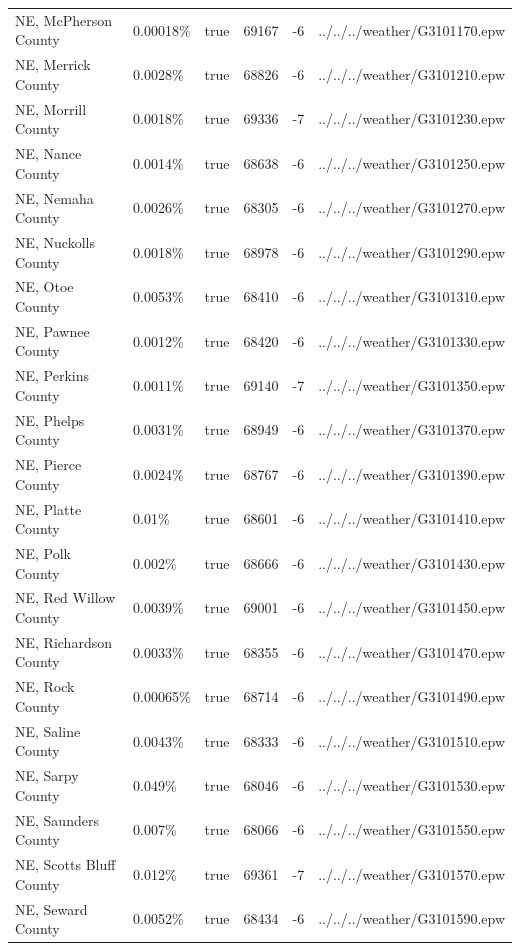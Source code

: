 \begin{longtable}[]{@{}llllll@{}}
NE, McPherson County & 0.00018\% & true & 69167 & -6 &
../../../weather/G3101170.epw \\
NE, Merrick County & 0.0028\% & true & 68826 & -6 &
../../../weather/G3101210.epw \\
NE, Morrill County & 0.0018\% & true & 69336 & -7 &
../../../weather/G3101230.epw \\
NE, Nance County & 0.0014\% & true & 68638 & -6 &
../../../weather/G3101250.epw \\
NE, Nemaha County & 0.0026\% & true & 68305 & -6 &
../../../weather/G3101270.epw \\
NE, Nuckolls County & 0.0018\% & true & 68978 & -6 &
../../../weather/G3101290.epw \\
NE, Otoe County & 0.0053\% & true & 68410 & -6 &
../../../weather/G3101310.epw \\
NE, Pawnee County & 0.0012\% & true & 68420 & -6 &
../../../weather/G3101330.epw \\
NE, Perkins County & 0.0011\% & true & 69140 & -7 &
../../../weather/G3101350.epw \\
NE, Phelps County & 0.0031\% & true & 68949 & -6 &
../../../weather/G3101370.epw \\
NE, Pierce County & 0.0024\% & true & 68767 & -6 &
../../../weather/G3101390.epw \\
NE, Platte County & 0.01\% & true & 68601 & -6 &
../../../weather/G3101410.epw \\
NE, Polk County & 0.002\% & true & 68666 & -6 &
../../../weather/G3101430.epw \\
NE, Red Willow County & 0.0039\% & true & 69001 & -6 &
../../../weather/G3101450.epw \\
NE, Richardson County & 0.0033\% & true & 68355 & -6 &
../../../weather/G3101470.epw \\
NE, Rock County & 0.00065\% & true & 68714 & -6 &
../../../weather/G3101490.epw \\
NE, Saline County & 0.0043\% & true & 68333 & -6 &
../../../weather/G3101510.epw \\
NE, Sarpy County & 0.049\% & true & 68046 & -6 &
../../../weather/G3101530.epw \\
NE, Saunders County & 0.007\% & true & 68066 & -6 &
../../../weather/G3101550.epw \\
NE, Scotts Bluff County & 0.012\% & true & 69361 & -7 &
../../../weather/G3101570.epw \\
NE, Seward County & 0.0052\% & true & 68434 & -6 &
../../../weather/G3101590.epw \\

\end{longtable}
